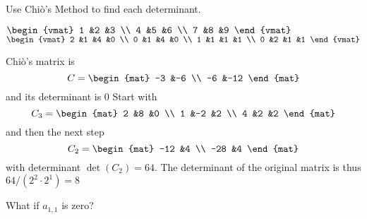 \begin{exercises}
  \item 
    Use Chi\`o's Method to find each determinant.
    \begin{exparts*}
      \partsitem 
        $
        \begin{vmat}
          1  &2  &3  \\
          4  &5  &6  \\
          7  &8  &9  
        \end{vmat}
        $
      \partsitem 
        $
        \begin{vmat}
          2  &1  &4  &0  \\
          0  &1  &4  &0  \\
          1  &1  &1  &1  \\
          0  &2  &1  &1  
        \end{vmat}
        $
    \end{exparts*}
    \begin{answer}
      \begin{exparts*}
        \partsitem Chi\`o's matrix is
        \begin{equation*}
          C=
          \begin{mat}
            -3 &-6 \\
            -6 &-12
          \end{mat}
        \end{equation*}
        and its determinant is $0$
        \partsitem Start with
        \begin{equation*}
          C_3=
          \begin{mat}
            2 &8  &0 \\
            1 &-2 &2 \\
            4 &2  &2
          \end{mat}
        \end{equation*}
        and then the next step
        \begin{equation*}
          C_2=
          \begin{mat}
            -12 &4 \\
            -28 &4
          \end{mat}
        \end{equation*}
        with determinant $\det(C_2)=64$. 
        The determinant of the original matrix is thus $64/(2^2\cdot 2^1)=8$
      \end{exparts*} 
    \end{answer}
  \item What if $a_{1,1}$ is zero?

\end{exercises}
